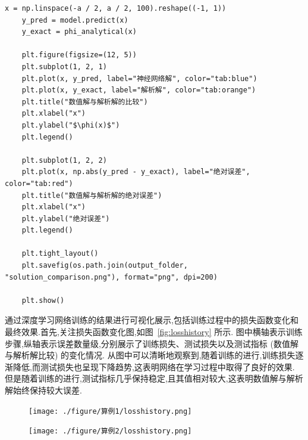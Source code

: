 \documentclass{Sichuan Normal University}
\begin{document}
\begin{lstlisting}[style=python,basicstyle=\footnotesize\fontspec{Courier New},]
    x = np.linspace(-a / 2, a / 2, 100).reshape((-1, 1))
    y_pred = model.predict(x)
    y_exact = phi_analytical(x)
    
    plt.figure(figsize=(12, 5))
    plt.subplot(1, 2, 1)
    plt.plot(x, y_pred, label="神经网络解", color="tab:blue")
    plt.plot(x, y_exact, label="解析解", color="tab:orange")
    plt.title("数值解与解析解的比较")
    plt.xlabel("x")
    plt.ylabel("$\phi(x)$")
    plt.legend()
    
    plt.subplot(1, 2, 2)
    plt.plot(x, np.abs(y_pred - y_exact), label="绝对误差", color="tab:red")
    plt.title("数值解与解析解的绝对误差")
    plt.xlabel("x")
    plt.ylabel("绝对误差")
    plt.legend()
    
    plt.tight_layout()
    plt.savefig(os.path.join(output_folder, "solution_comparison.png"), format="png", dpi=200)
    
    plt.show()
\end{lstlisting}
通过深度学习网络训练的结果进行可视化展示,包括训练过程中的损失函数变化和最终效果.首先,关注损失函数变化图,如图~\ref{fig:losshistory} 所示.
图中横轴表示训练步骤,纵轴表示误差数量级,分别展示了训练损失、测试损失以及测试指标 (数值解与解析解比较) 的变化情况.
从图中可以清晰地观察到,随着训练的进行,训练损失逐渐降低,而测试损失也呈现下降趋势,这表明网络在学习过程中取得了良好的效果.
但是随着训练的进行,测试指标几乎保持稳定,且其值相对较大,这表明数值解与解析解始终保持较大误差.

\begin{figure}[H]
    \centering
    \begin{minipage}[c]{0.48\textwidth}
    \centering
    \texttt{[image: ./figure/算例1/losshistory.png]}
    \end{minipage}
    \hspace{0.02\textwidth}
    \begin{minipage}[c]{0.48\textwidth}
    \centering
    \texttt{[image: ./figure/算例2/losshistory.png]}
    \end{minipage}\\[3mm]
    \begin{minipage}[t]{0.48\textwidth}
    \centering
    \label{fig:losshistory}
    \end{minipage}
    \hspace{0.02\textwidth}
    \begin{minipage}[t]{0.48\textwidth}
    \centering
    \label{fig:losshistory2}
    \end{minipage}
    \end{figure}
\end{document}
